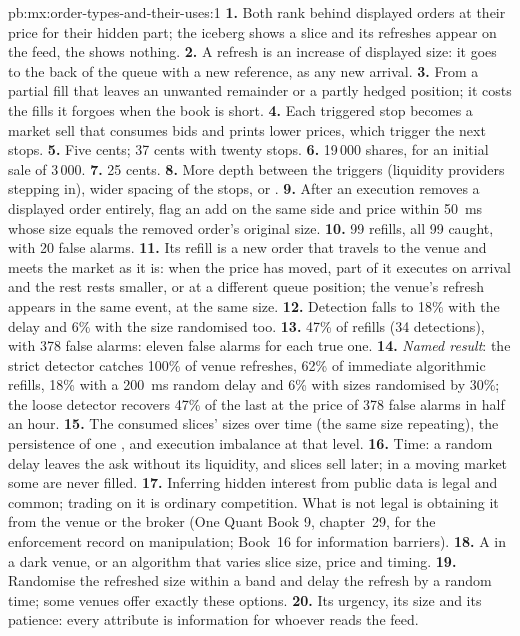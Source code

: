\begin{solution}{pb:mx:order-types-and-their-uses:1}
\textbf{1.} Both rank behind displayed orders at their price for their hidden part; the iceberg shows a slice and its refreshes appear on the feed, the
 shows nothing.
\textbf{2.} A refresh is an increase of displayed size: it goes to the back of the queue with a new reference, as any new arrival.
\textbf{3.} From a partial fill that leaves an unwanted remainder or a partly hedged position; it costs the fills it forgoes when the book is short.
\textbf{4.} Each triggered stop becomes a market sell that consumes bids and prints lower prices, which trigger the next stops.
\textbf{5.} Five cents; 37 cents with twenty stops.
\textbf{6.} 19\,000 shares, for an initial sale of 3\,000.
\textbf{7.} 25 cents.
\textbf{8.} More depth between the triggers (liquidity providers stepping in), wider spacing of the stops, or .
\textbf{9.} After an execution removes a displayed order entirely, flag an add on the same side and price within 50~ms whose size equals the removed
order's original size.
\textbf{10.} 99 refills, all 99 caught, with 20 false alarms.
\textbf{11.} Its refill is a new order that travels to the venue and meets the market as it is: when the price has moved, part of it executes on arrival
and the rest rests smaller, or at a different queue position; the venue's refresh appears in the same event, at the same size.
\textbf{12.} Detection falls to 18\% with the delay and 6\% with the size randomised too.
\textbf{13.} 47\% of refills (34 detections), with 378 false alarms: eleven false alarms for each true one.
\textbf{14.} \emph{Named result}: the strict detector catches 100\% of venue refreshes, 62\% of immediate algorithmic refills, 18\% with a 200~ms random
delay and 6\% with sizes randomised by 30\%; the loose detector recovers 47\% of the last at the price of 378 false alarms in half an hour.
\textbf{15.} The consumed slices' sizes over time (the same size repeating), the persistence of one , and execution imbalance at that level.
\textbf{16.} Time: a random delay leaves the ask without its liquidity, and slices sell later; in a moving market some are never filled.
\textbf{17.} Inferring hidden interest from public data is legal and common; trading on it is ordinary competition. What is not legal is obtaining it
from the venue or the broker (One Quant Book 9, chapter~29, for the enforcement record on manipulation; Book~16 for information barriers).
\textbf{18.} A  in a dark venue, or an algorithm that varies slice size, price and timing.
\textbf{19.} Randomise the refreshed size within a band and delay the refresh by a random time; some venues offer exactly these options.
\textbf{20.} Its urgency, its size and its patience: every attribute is information for whoever reads the feed.
\end{solution}

